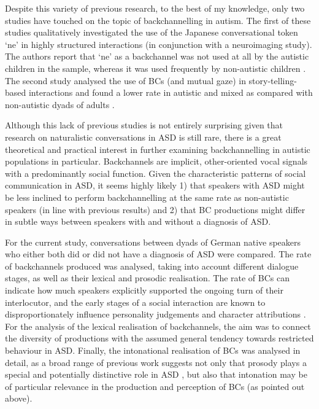 Despite this variety of previous research, to the best of my knowledge, only two studies have touched on the topic of backchannelling in autism. The first of these studies qualitatively investigated the use of the Japanese conversational token `ne' in highly structured interactions (in conjunction with a neuroimaging study). The authors report that `ne' as a backchannel was not used at all by the autistic children in the sample, whereas it was used frequently by non-autistic children \citep{yoshimuraTurntakingChildrenAutism2020}. The second study analysed the use of BCs (and mutual gaze) in story-telling-based interactions and found a lower rate in autistic and mixed as compared with non-autistic dyads of adults \citep{rifaiInvestigatingMarkersRapport2022}.

Although this lack of previous studies is not entirely surprising given that research on naturalistic conversations in ASD is still rare, there is a great theoretical and practical interest in further examining backchannelling in autistic populations in particular. Backchannels are implicit, other-oriented vocal signals with a predominantly social function. Given the characteristic patterns of social communication in ASD, it seems highly likely 1) that speakers with ASD might be less inclined to perform backchannelling at the same rate as non-autistic speakers (in line with previous results) and 2) that BC productions might differ in subtle ways between speakers with and without a diagnosis of ASD.

For the current study, conversations between dyads of German native speakers who either both did or did not have a diagnosis of ASD were compared. The rate of backchannels produced was analysed, taking into account different dialogue stages, as well as their lexical and prosodic realisation. The rate of BCs can indicate how much speakers explicitly supported the ongoing turn of their interlocutor, and the early stages of a social interaction are known to disproportionately influence personality judgements and character attributions \citep[see ;][]{mcaleerHowYouSay2014}. For the analysis of the lexical realisation of backchannels, the aim was to connect the diversity of productions with the assumed general tendency towards restricted behaviour in ASD. Finally, the intonational realisation of BCs was analysed in detail, as a broad range of previous work suggests not only that prosody plays a special and potentially distinctive role in ASD \citep[see  and e.g.][]{krugerProsodicDecodingEncoding2018,griceLinguisticProsodyAutism2023,mccannProsodyAutismSpectrum2003a,paulPerceptionProductionProsody2005}, but also that intonation may be of particular relevance in the production and perception of BCs (as pointed out above).

